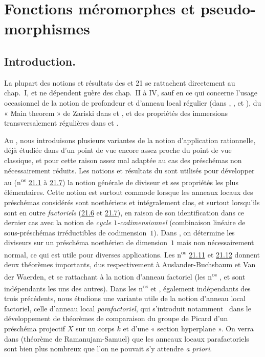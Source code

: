 \section{Fonctions méromorphes et pseudo-morphismes}
\label{IV.20}

\setcounter{subsection}{-1}
\subsection{Introduction.}

La plupart des notions et résultats des \textsection{} et 21 se rattachent directement au chap.~I, et ne dépendent guère des chap.~II à IV, sauf en ce qui concerne l'usage occasionnel de la notion de profondeur et d'anneau local régulier (dans , ,  et ), du « Main theorem » de Zariski dans  et , et des propriétés des immersions transversalement régulières dans  et .

Au , nous introduisons plusieurs variantes de la notion d'application rationnelle, déjà étudiée dans  d'un point de vue encore assez proche du point de vue classique, et pour cette raison assez mal adaptée au cas des préschémas non nécessairement réduits.
Les notions et résultats du  sont utilisés pour développer au  (n\textsuperscript{os} \hyperref[IV.21.1]{21.1} à \hyperref[IV.21.7]{21.7}) la notion générale de diviseur et ses propriétés les plus élémentaires.
Cette notion est surtout commode lorsque les anneaux locaux des préschémas considérés sont noethériens et intégralement clos, et surtout lorsqu'ils sont en outre \emph{factoriels} (\hyperref[IV.21.6]{21.6} et \hyperref[IV.21.7]{21.7}), en raison de son identification dans ce dernier cas avec la notion de \emph{cycle $1$-codimensionnel} (combinaison linéaire de sous-préschémas irréductibles de codimension~$1$).
Dans , on détermine les diviseurs sur un préschéma noethérien de dimension~$1$ mais non nécessairement normal, ce qui est utile pour diverses applications.
Les n\textsuperscript{os} \hyperref[IV.21.11]{21.11} et \hyperref[IV.21.12]{21.12} donnent deux théorèmes importants, dus respectivement à Auslander-Buchsbaum et Van der Waerden, et se rattachant à la notion d'anneau factoriel (les n\textsuperscript{os} ,  et  sont indépendants les uns des autres).
Dans les n\textsuperscript{os}  et , également indépendants des trois précédents, nous étudions une variante utile de la notion d'anneau local factoriel, celle d'anneau local \emph{parafactoriel}, qui s'introduit notamment~\cite{IV-41} dans le développement de théorèmes de comparaison du groupe de Picard d'un préschéma projectif $X$ sur un corps $k$ et d'une « section hyperplane ».
On verra dans  (théorème de Ramanujam-Samuel) que les anneaux locaux parafactoriels sont bien plus nombreux que l'on ne pouvait s'y attendre \emph{a priori}.

